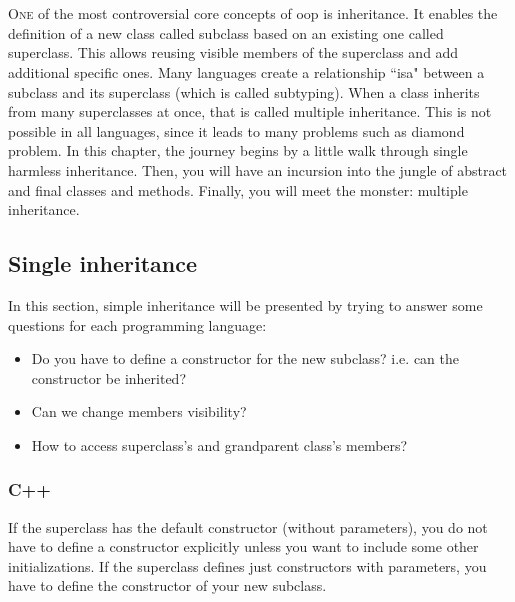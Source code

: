 \documentclass{KodeBook}
\begin{document}
		\mainmatter
	
\fi

\chapter{}

\begin{introduction}
	\lettrine{O}{ne} of the most controversial core concepts of \ac{oop} is inheritance.
	It enables the definition of a new class called subclass based on an existing one called superclass. 
	This allows reusing visible members of the superclass and add additional specific ones. 
	Many languages create a relationship ``isa" between a subclass and its superclass (which is called subtyping).
	When a class inherits from many superclasses at once, that is called multiple inheritance. 
	This is not possible in all languages, since it leads to many problems such as diamond problem.
	In this chapter, the journey begins by a little walk through single harmless inheritance. 
	Then, you will have an incursion into the jungle of abstract and final classes and methods. 
	Finally, you will meet the monster: multiple inheritance. 
\end{introduction} 


\section{Single inheritance}

In this section, simple inheritance will be presented by trying to answer some questions for each programming language:
\begin{itemize}
	\item Do you have to define a constructor for the new subclass? i.e. can the constructor be inherited?
	\item Can we change members visibility?
	\item How to access superclass's and grandparent class's members?
\end{itemize}

\subsection{C++}

If the superclass has the default constructor (without parameters), you do not have to define a constructor explicitly unless you want to include some other initializations. 
If the superclass defines just constructors with parameters, you have to define the constructor of your new subclass. 
\end{document}
